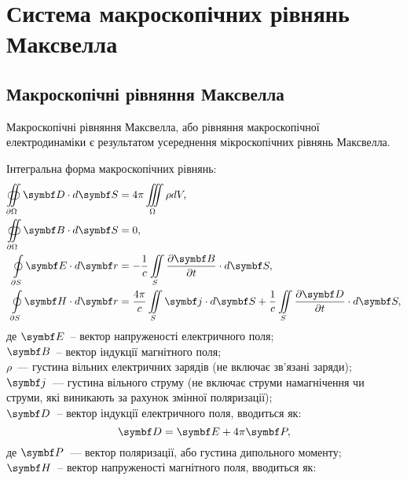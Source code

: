 \newpage
\chapter{Система \mbox{макроскопічних} рівнянь Максвелла}


\section{Макроскопічні рівняння Максвелла}

Макроскопічні рівняння Максвелла, або рівняння макроскопічної електродинаміки є результатом усереднення мікроскопічних рівнянь Максвелла.

Інтегральна форма макроскопічних рівнянь:
\begin{align}
	\oiint\limits_{\partial\Omega} \Dfield\cdot d\vect{S} & = 4\pi\iiint\limits_{\Omega}\rho dV,   \label{essInt
	I}                                                                                                         \\
	\oiint\limits_{\partial\Omega} \Bfield\cdot d\vect{S} & = 0,   \label{essInt
	II}                                                                                                                                   \\
	\oint\limits_{\partial S} \Efield\cdot d\vect{r}  & = - \frac1c \iint\limits_S \frac{\partial\Bfield}{\partial t}\cdot d\vect{S},  \label{Int
	III}                                                             \\
	\oint\limits_{\partial S} \Hfield\cdot d\vect{r}  & =\dfrac{4\pi}{c} \iint\limits_S \vect{j}\cdot d\vect{S} +\frac{1}{c} \iint\limits_S
	\frac{\partial\Dfield}{\partial t}\cdot d\vect{S},  \label{essInt IV}
\end{align}
де $ \Efield $~-- вектор напруженості електричного поля;\\
\hspace*{3ex}$ \Bfield $~-- вектор індукції магнітного поля; \\
\hspace*{3ex}$ \rho $~--- густина вільних електричних зарядів (не включає зв'язані заряди); \\
\hspace*{3ex}$\vect{j}$~--- густина вільного струму (не включає струми намагнічення чи струми, які виникають за рахунок змінної поляризації); \\
$ \Dfield $~-- вектор індукції електричного поля, вводиться як:
\begin{equation}
	\Dfield = \Efield + 4\pi\vect{P},
\end{equation}
де $\vect{P}$~---  вектор поляризації, або густина дипольного моменту;\\
\hspace*{2ex} $ \Hfield $~-- вектор напруженості магнітного поля, вводиться як:

